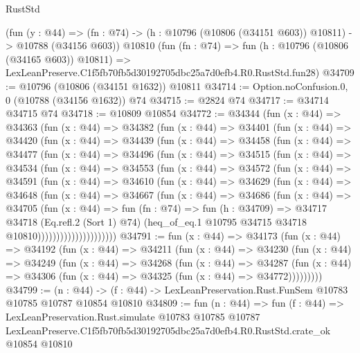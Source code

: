 \begin{lexlean}{RustStd}
\begin{coremodule}
    (fun (y : @44) =>
    (fn : @74) -> (h : @10796 (@10806 (@34151 @603)) @10811) -> @10788 (@34156 @603))
    @10810
    (fun (fn : @74) =>
    fun (h : @10796 (@10806 (@34165 @603)) @10811) =>
    LexLeanPreserve.C1f5fb70fb5d30192705dbc25a7d0efb4.R0.RustStd.fun28)
@34709 := @10796 (@10806 (@34151 @1632)) @10811
@34714 := Option.noConfusion.{0, 0} (@10788 (@34156 @1632)) @74
@34715 := @2824 @74
@34717 := @34714 @34715 @74
@34718 := @10809 @10854
@34772 := @34344
    (fun (x : @44) =>
    @34363
      (fun (x : @44) =>
      @34382
        (fun (x : @44) =>
        @34401
          (fun (x : @44) =>
          @34420
            (fun (x : @44) =>
            @34439
              (fun (x : @44) =>
              @34458
                (fun (x : @44) =>
                @34477
                  (fun (x : @44) =>
                  @34496
                    (fun (x : @44) =>
                    @34515
                      (fun (x : @44) =>
                      @34534
                        (fun (x : @44) =>
                        @34553
                          (fun (x : @44) =>
                          @34572
                            (fun (x : @44) =>
                            @34591
                              (fun (x : @44) =>
                              @34610
                                (fun (x : @44) =>
                                @34629
                                  (fun (x : @44) =>
                                  @34648
                                    (fun (x : @44) =>
                                    @34667
                                      (fun (x : @44) =>
                                      @34686
                                        (fun (x : @44) =>
                                        @34705
                                          (fun (x : @44) =>
                                          fun (fn : @74) =>
                                          fun (h : @34709) =>
                                          @34717
                                            @34718
                                            (Eq.refl.{2} (Sort 1) @74)
                                            (heq_of_eq.{1}
                                              @10795
                                              @34715
                                              @34718
                                              @10810)))))))))))))))))))))
@34791 := fun (x : @44) =>
  @34173
    (fun (x : @44) =>
    @34192
      (fun (x : @44) =>
      @34211
        (fun (x : @44) =>
        @34230
          (fun (x : @44) =>
          @34249
            (fun (x : @44) =>
            @34268
              (fun (x : @44) =>
              @34287
                (fun (x : @44) => @34306 (fun (x : @44) => @34325 (fun (x : @44) => @34772)))))))))
@34799 := (n : @44) ->
  (f : @44) -> LexLeanPreservation.Rust.FunSem @10783 @10785 @10787 @10854 @10810
@34809 := fun (n : @44) =>
  fun (f : @44) =>
  LexLeanPreservation.Rust.simulate
    @10783
    @10785
    @10787
    LexLeanPreserve.C1f5fb70fb5d30192705dbc25a7d0efb4.R0.RustStd.crate_ok
    @10854
    @10810
\end{coremodule}
\end{lexlean}
